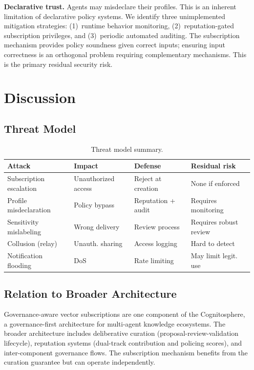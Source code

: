 \documentclass[11pt]{article}
\begin{document}
\textbf{Declarative trust.} Agents may misdeclare their profiles. This is an inherent limitation of declarative policy systems. We identify three unimplemented mitigation strategies: (1)~runtime behavior monitoring, (2)~reputation-gated subscription privileges, and (3)~periodic automated auditing. The subscription mechanism provides policy soundness given correct inputs; ensuring input correctness is an orthogonal problem requiring complementary mechanisms. This is the primary residual security risk.

\section{Discussion}

\subsection{Threat Model}

\begin{table}[h]
\centering
\caption{Threat model summary.}
\label{tab:threats}
\small
\begin{tabular}{@{}p{2.2cm}p{2cm}p{2.2cm}p{2.2cm}@{}}
\toprule
Attack & Impact & Defense & Residual risk \\
\midrule
Subscription escalation & Unauthorized access & Reject at creation & None if enforced \\
Profile misdeclaration & Policy bypass & Reputation + audit & Requires monitoring \\
Sensitivity mislabeling & Wrong delivery & Review process & Requires robust review \\
Collusion (relay) & Unauth. sharing & Access logging & Hard to detect \\
Notification flooding & DoS & Rate limiting & May limit legit. use \\
\bottomrule
\end{tabular}
\end{table}

\subsection{Relation to Broader Architecture}

Governance-aware vector subscriptions are one component of the Cognitosphere, a governance-first architecture for multi-agent knowledge ecosystems. The broader architecture includes deliberative curation (proposal-review-validation lifecycle), reputation systems (dual-track contribution and policing scores), and inter-component governance flows. The subscription mechanism benefits from the curation guarantee but can operate independently.
\end{document}
